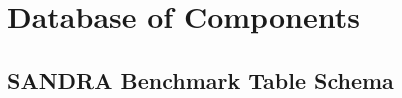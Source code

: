 

\chapter{Database of Components} \label{app:database_components}
    \section{SANDRA Benchmark Table Schema}\label{app:sandra_benchmark_table_schema}
